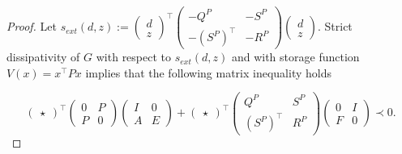 \documentclass[11pt,a4paper,oneside,DIV=12,headings=small]{scrartcl}
\theoremstyle{plain}
\begin{document}
\begin{proof}Let $s_{ext}(d,z):=\left(\begin{smallmatrix} d \\ z \end{smallmatrix}\right)^\top 
\left(\begin{smallmatrix} -Q^P & -S^P \\ -(S^P)^\top & -R^P \end{smallmatrix}\right)\left(\begin{smallmatrix} d \\ z \end{smallmatrix}\right)$. Strict dissipativity of $G$ with respect to $s_{ext}(d,z)$ and with storage function $V(x)=x^\top P x$ implies that the following matrix inequality holds

\begin{equation}
\label{DissLemma}
\begin{pmatrix}\star\end{pmatrix}^\top
\begin{pmatrix}0 & P \\ P & 0\end{pmatrix}
\begin{pmatrix}I & 0 \\ A & E\end{pmatrix}+
\begin{pmatrix}\star\end{pmatrix}^\top
\begin{pmatrix}Q^P & S^P \\ (S^P)^\top & R^P\end{pmatrix}
\begin{pmatrix}0 & I \\ F & 0\end{pmatrix} \prec 0.
\end{equation}


\end{proof}
\end{document}
